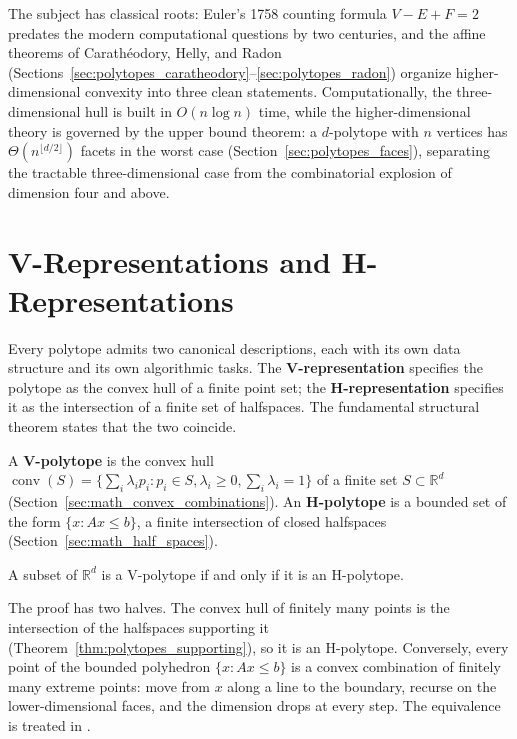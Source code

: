 The subject has classical roots: Euler's 1758 counting formula
$V - E + F = 2$ \cite{euler1758} predates the modern computational questions
by two centuries, and the affine theorems of Carath\'eodory, Helly, and
Radon (Sections~\ref{sec:polytopes_caratheodory}--\ref{sec:polytopes_radon})
organize higher-dimensional convexity into three clean statements.
Computationally, the three-dimensional hull is built in $O(n \log n)$ time,
while the higher-dimensional theory is governed by the upper bound theorem:
a $d$-polytope with $n$ vertices has $\Theta(n^{\lfloor d/2 \rfloor})$
facets in the worst case (Section~\ref{sec:polytopes_faces}), separating the
tractable three-dimensional case from the combinatorial explosion of
dimension four and above.


\section{V-Representations and H-Representations}
\label{sec:polytopes_representations}

Every polytope admits two canonical descriptions, each with its own data
structure and its own algorithmic tasks. The \textbf{V-representation}
specifies the polytope as the convex hull of a finite point set; the
\textbf{H-representation} specifies it as the intersection of a finite set
of halfspaces. The fundamental structural theorem states that the two
coincide.

\begin{definition}\label{def:polytopes_v_h}
  A \textbf{V-polytope} is the convex hull
  $\operatorname{conv}(S) = \{ \sum_i \lambda_i p_i : p_i \in S, \lambda_i
  \ge 0, \sum_i \lambda_i = 1 \}$ of a finite set $S \subset \mathbb{R}^d$
  (Section~\ref{sec:math_convex_combinations}). An \textbf{H-polytope} is a
  bounded set of the form $\{ x : Ax \le b \}$, a finite intersection of
  closed halfspaces (Section~\ref{sec:math_half_spaces}).
\end{definition}

\begin{theorem}\label{thm:polytopes_minkowski_weyl}
  A subset of $\mathbb{R}^d$ is a V-polytope if and only if it is an
  H-polytope.
\end{theorem}

The proof has two halves. The convex hull of finitely many points is the
intersection of the halfspaces supporting it (Theorem~\ref{thm:polytopes_supporting}),
so it is an H-polytope. Conversely, every point of the bounded polyhedron
$\{x : Ax \le b\}$ is a convex combination of finitely many extreme points:
move from $x$ along a line to the boundary, recurse on the
lower-dimensional faces, and the dimension drops at every step. The
equivalence is treated in \cite{edelsbrunner1987,preparata1985}.

